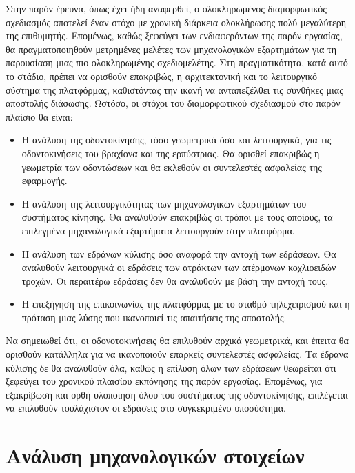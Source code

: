 \par Στην παρόν έρευνα, όπως έχει ήδη αναφερθεί, ο ολοκληρωμένος διαμορφωτικός σχεδιασμός αποτελεί έναν στόχο με χρονική διάρκεια ολοκλήρωσης πολύ μεγαλύτερη της επιθυμητής. Επομένως, καθώς ξεφεύγει των ενδιαφερόντων της παρόν εργασίας, θα πραγματοποιηθούν μετρημένες μελέτες των μηχανολογικών εξαρτημάτων για τη παρουσίαση μιας πιο ολοκληρωμένης σχεδιομελέτης. Στη πραγματικότητα, κατά αυτό το στάδιο, πρέπει να ορισθούν επακριβώς, η αρχιτεκτονική και το λειτουργικό σύστημα της πλατφόρμας, καθιστόντας την ικανή να ανταπεξέλθει τις συνθήκες μιας αποστολής διάσωσης. Ωστόσο, οι στόχοι του διαμορφωτικού σχεδιασμού στο παρόν πλαίσιο θα είναι:
\begin{itemize}
    \item Η ανάλυση της οδοντοκίνησης, τόσο γεωμετρικά όσο και λειτουργικά, για τις οδοντοκινήσεις του βραχίονα και της ερπύστριας. Θα ορισθεί επακριβώς η γεωμετρία των οδοντώσεων και θα εκλεθούν οι συντελεστές ασφαλείας της εφαρμογής.
    \item Η ανάλυση της λειτουργικότητας των μηχανολογικών εξαρτημάτων του συστήματος κίνησης. Θα αναλυθούν επακριβώς οι τρόποι με τους οποίους, τα επιλεγμένα μηχανολογικά εξαρτήματα λειτουργούν στην πλατφόρμα.
    \item Η ανάλυση των εδράνων κύλισης όσο αναφορά την αντοχή των εδράσεων. Θα αναλυθούν λειτουργικά οι εδράσεις των ατράκτων των ατέρμονων κοχλιοειδών τροχών. Οι περαιτέρω εδράσεις δεν θα αναλυθούν με βάση την αντοχή τους. 
    \item Η επεξήγηση της επικοινωνίας της πλατφόρμας με το σταθμό τηλεχειρισμού και η πρόταση μιας λύσης που ικανοποιεί τις απαιτήσεις της αποστολής.
\end{itemize}

Να σημειωθεί ότι, οι οδονοτοκινήσεις θα επιλυθούν αρχικά γεωμετρικά, και έπειτα θα ορισθούν κατάλληλα για να ικανοποιούν επαρκείς συντελεστές ασφαλείας. Τα έδρανα κύλισης δε θα αναλυθούν όλα, καθώς η επίλυση όλων των εδράσεων θεωρείται ότι ξεφεύγει του χρονικού πλαισίου εκπόνησης της παρόν εργασίας. Επομένως, για εξακρίβωση και ορθή υλοποίηση όλου του συστήματος της οδοντοκίνησης, επιλέγεται να επιλυθούν τουλάχιστον οι εδράσεις στο συγκεκριμένο υποσύστημα.



\section{Ανάλυση μηχανολογικών στοιχείων}
